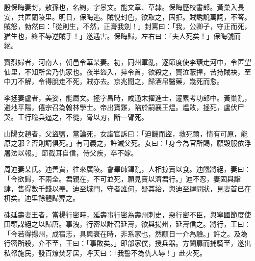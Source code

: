 \begin{pinyinscope}
 殷保晦妻封，敖孫也，名絢，字景文。能文章、草隸。保晦歷校書郎。黃巢入長安，共匿蘭陵里。明日，保晦逃。賊悅封色，欲取之，固拒。賊誘說萬詞，不答。賊怒，勃然曰：「從則生，不然，正膏我劍！」封罵曰：「我，公卿子，守正而死，猶生也，終不辱逆賊手！」遂遇害。保晦歸，左右曰：「夫人死矣！」保晦號而絕。



 竇烈婦者，河南人，朝邑令華某妻。初，同州軍亂，逐節度使李瑭走河中，令匿望仙里，不知所舍乃仇家也。夜半盜入，捽令首，欲殺之，竇泣蔽捍，苦持賊袂，至中刀不解，令得脫走不死，賊亦去。京兆聞之，歸酒帛醫藥，幾死而愈。



 李拯妻盧者，美姿，能屬文。拯字昌時，咸通末擢進士，遷累考功郎中。黃巢亂，避地平陽，僖宗召為翰林學士。帝出寶雞，陷於嗣襄王煴。煴敗，拯死，盧伏尸哭。王行瑜兵逼之，不從，脅以刃，斷一臂死。



 山陽女趙者，父盜鹽，當論死，女詣官訴曰：「迫饑而盜，救死爾，情有可原，能原之邪？否則請俱死。」有司義之，許減父死。女曰：「身今為官所賜，願毀服依浮屠法以報。」節截耳自信，侍父疾，卒不嫁。



 周迪妻某氏。迪善賈，往來廣陵。會畢師鐸亂，人相掠賣以食。迪饑將絕，妻曰：「今欲歸，不兩全。君親在，不可並死，願見賣以濟君行。」迪不忍，妻固與詣肆，售得數千錢以奉。迪至城門，守者誰何，疑其紿，與迪至肆問狀，見妻首已在枅矣。迪里餘體歸葬之。



 硃延壽妻王者，當楊行密時，延壽事行密為壽州刺史，惡行密不臣，與寧國節度使田頵謀絕之以歸唐。事洩，行密以計召延壽，欲與揚州，延壽信之。將行，王曰：「今若得揚州，成宿志，具興衰在時，非系家也，然願日一介為驗。」許之。及為行密所殺，介不至，王曰：「事敗矣。」即部家僕，授兵器。方闔扉而捕騎至，遂出私帑施民，發百燎焚牙居，呼天曰：「我誓不為仇人辱！」赴火死。



\end{pinyinscope}